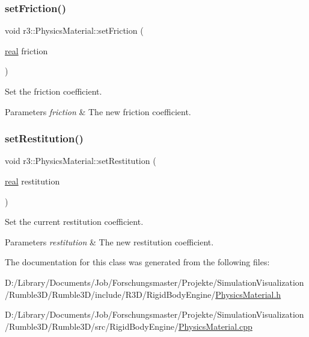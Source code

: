 \subsubsection{\texorpdfstring{set\+Friction()}{setFriction()}}
{\footnotesize\ttfamily void r3\+::\+Physics\+Material\+::set\+Friction (\begin{DoxyParamCaption}\item[{\mbox{\hyperlink{namespacer3_ab2016b3e3f743fb735afce242f0dc1eb}{real}}}]{friction }\end{DoxyParamCaption})}



Set the friction coefficient. 


\begin{DoxyParams}{Parameters}
{\em friction} & The new friction coefficient. \\
\hline
\end{DoxyParams}
\mbox{\label{classr3_1_1_physics_material_a2056c195a2d655aefe9a480c28e67ddb}} 
\subsubsection{\texorpdfstring{set\+Restitution()}{setRestitution()}}
{\footnotesize\ttfamily void r3\+::\+Physics\+Material\+::set\+Restitution (\begin{DoxyParamCaption}\item[{\mbox{\hyperlink{namespacer3_ab2016b3e3f743fb735afce242f0dc1eb}{real}}}]{restitution }\end{DoxyParamCaption})}



Set the current restitution coefficient. 


\begin{DoxyParams}{Parameters}
{\em restitution} & The new restitution coefficient. \\
\hline
\end{DoxyParams}


The documentation for this class was generated from the following files\+:\begin{DoxyCompactItemize}
\item 
D\+:/\+Library/\+Documents/\+Job/\+Forschungsmaster/\+Projekte/\+Simulation\+Visualization/\+Rumble3\+D/\+Rumble3\+D/include/\+R3\+D/\+Rigid\+Body\+Engine/\mbox{\hyperlink{_physics_material_8h}{Physics\+Material.\+h}}\item 
D\+:/\+Library/\+Documents/\+Job/\+Forschungsmaster/\+Projekte/\+Simulation\+Visualization/\+Rumble3\+D/\+Rumble3\+D/src/\+Rigid\+Body\+Engine/\mbox{\hyperlink{_physics_material_8cpp}{Physics\+Material.\+cpp}}\end{DoxyCompactItemize}
